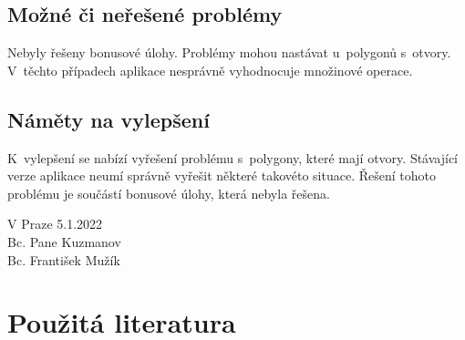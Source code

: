 \documentclass[a4paper, 12pt, oneside, titlepage]{article} %
\begin{document}
\subsection{Možné či neřešené problémy} \label{mcn_problemy}
Nebyly řešeny bonusové úlohy. Problémy mohou nastávat u~polygonů s~otvory. V~těchto případech aplikace nesprávně vyhodnocuje množinové operace.

\subsection{Náměty na vylepšení} \label{vylepseni}
K~vylepšení se nabízí vyřešení problému s~polygony, které mají otvory. Stávající verze aplikace neumí správně vyřešit některé takovéto situace. Řešení tohoto problému je součástí bonusové úlohy, která nebyla řešena.




\begin{flushright}
V Praze 5.1.2022\\
\vspace{2mm}
Bc. Pane Kuzmanov\\
Bc. František Mužík\\
\end{flushright}


\clearpage 
\section*{Použitá literatura}
\renewcommand{\section}[2]{}%


\end{document}
